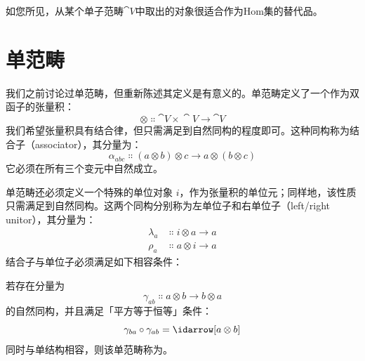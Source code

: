 如您所见，从某个单子范畴$\cat{V}$中取出的对象很适合作为Hom集的替代品。

\section{单范畴}

我们之前讨论过单范畴，但重新陈述其定义是有意义的。单范畴定义了一个作为双函子的张量积：
$$\otimes \Colon \cat{V}\times{}\cat{V} \to \cat{V}$$
我们希望张量积具有结合律，但只需满足到自然同构的程度即可。这种同构称为结合子（associator），其分量为：
$$\alpha_{a b c} \Colon (a \otimes b) \otimes c \to a \otimes (b \otimes c)$$
它必须在所有三个变元中自然成立。

单范畴还必须定义一个特殊的单位对象 $i$，作为张量积的单位元；同样地，该性质只需满足到自然同构。这两个同构分别称为左单位子和右单位子（left/right unitor），其分量为：
\begin{align*}
  \lambda_a & \Colon i \otimes a \to a \\
  \rho_a    & \Colon a \otimes i \to a
\end{align*}
结合子与单位子必须满足如下相容条件：

\begin{figure}[H]
  \centering
\end{figure}

\begin{figure}[H]
  \centering
\end{figure}

\noindent
若存在分量为
$$\gamma_{a b} \Colon a \otimes b \to b \otimes a$$
的自然同构，并且满足「平方等于恒等」条件：
$$\gamma_{b a} \circ \gamma_{a b} = \idarrow[a \otimes b]$$
同时与单结构相容，则该单范畴称为。

